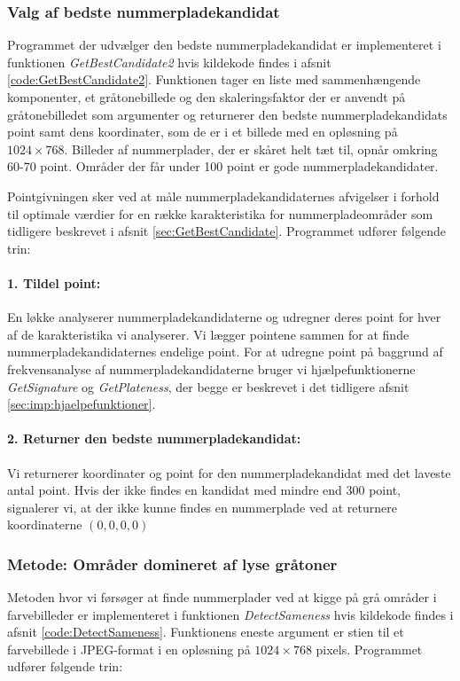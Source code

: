 \subsubsection{Valg af bedste nummerpladekandidat}
\label{sec:imp:GetBestCandidate}
Programmet der udvælger den bedste nummerpladekandidat er implementeret i funktionen \textit{GetBestCandidate2} hvis kildekode findes i afsnit \vref{code:GetBestCandidate2}. Funktionen tager en liste med sammenhængende komponenter, et gråtonebillede og den skaleringsfaktor der er anvendt på gråtonebilledet som argumenter og returnerer den bedste nummerpladekandidats point samt dens koordinater, som de er i et billede med en opløsning på $1024 \times 768$. Billeder af nummerplader, der er skåret helt tæt til, opnår omkring 60-70 point. Områder der får under 100 point er gode nummerpladekandidater. 

Pointgivningen sker ved at måle nummerpladekandidaternes afvigelser i forhold til optimale værdier for en række karakteristika for nummerpladeområder som tidligere beskrevet i afsnit \vref{sec:GetBestCandidate}.
Programmet udfører følgende trin:

\paragraph{1. Tildel point:}
En løkke analyserer nummerpladekandidaterne og udregner deres point for hver af de karakteristika vi analyserer. Vi lægger pointene sammen for at finde nummerpladekandidaternes endelige point. For at udregne point på baggrund af frekvensanalyse af nummerpladekandidaterne bruger vi hjælpefunktionerne \textit{GetSignature} og \textit{GetPlateness}, der begge er beskrevet i det tidligere afsnit \vref{sec:imp:hjaelpefunktioner}. 

\paragraph{2. Returner den bedste nummerpladekandidat:}
Vi returnerer koordinater og point for den nummerpladekandidat med det laveste antal point. Hvis der ikke findes en kandidat med mindre end 300 point, signalerer vi, at der ikke kunne findes en nummerplade ved at returnere koordinaterne $(0,0,0,0)$ 


\subsubsection{Metode: Områder domineret af lyse gråtoner}
Metoden hvor vi førsøger at finde nummerplader ved at kigge på grå områder i farvebilleder er implementeret i funktionen \textit{DetectSameness} hvis kildekode findes i afsnit \vref{code:DetectSameness}. Funktionens eneste argument er stien til et farvebillede i JPEG-format i en opløsning på $1024 \times 768$ pixels. Programmet udfører følgende trin:

